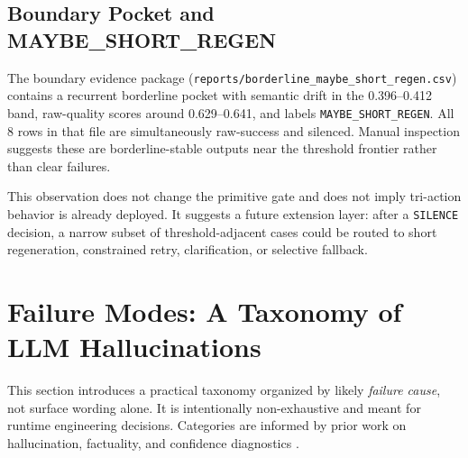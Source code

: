 \documentclass[11pt]{article}
\begin{document}
\subsection{Boundary Pocket and MAYBE\_SHORT\_REGEN}
The boundary evidence package (\texttt{reports/borderline\_maybe\_short\_regen.csv}) contains a recurrent borderline pocket with semantic drift in the 0.396--0.412 band, raw-quality scores around 0.629--0.641, and labels \texttt{MAYBE\_SHORT\_REGEN}. All 8 rows in that file are simultaneously raw-success and silenced. Manual inspection suggests these are borderline-stable outputs near the threshold frontier rather than clear failures.

This observation does not change the primitive gate and does not imply tri-action behavior is already deployed. It suggests a future extension layer: after a \texttt{SILENCE} decision, a narrow subset of threshold-adjacent cases could be routed to short regeneration, constrained retry, clarification, or selective fallback.

\section{Failure Modes: A Taxonomy of LLM Hallucinations}
This section introduces a practical taxonomy organized by likely \emph{failure cause}, not surface wording alone. It is intentionally non-exhaustive and meant for runtime engineering decisions. Categories are informed by prior work on hallucination, factuality, and confidence diagnostics \cite{ji2023survey,maynez2020faithfulness,manakul2023selfcheckgpt,min2023factscore}.
\end{document}
